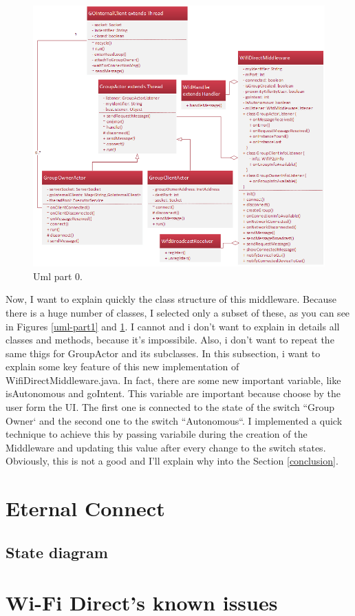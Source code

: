 \begin{figure}[thpb]
	\centering
	\includegraphics[scale=0.6]{./images/chap2/uml-parte2.png}
	\caption{Uml part 0.}
	\label{uml-part2}
\end{figure}	


Now, I want to explain quickly the class structure of this middleware. Because there is a huge number of classes, I selected only a subset of these, as you can see in Figures \ref{uml-part1} and \ref{uml-part2}.
I cannot and i don't want to explain in details all classes and methods, because it's impossibile. Also, i don't want to repeat the same thigs for GroupActor and its subclasses.
In this subsection, i want to explain some key feature of this new implementation of WifiDirectMiddleware.java.
In fact, there are some new important variable, like isAutonomous and goIntent. This variable are important because choose by the user form the UI. The first one is connected to the state of the switch ``Group Owner` and the second one to the switch ``Autonomous``. 
I implemented a quick technique to achieve this by passing variabile during the creation of the Middleware and updating this value after every change to the switch states. Obviously, this is not a good and I'll explain why into the Section \ref{conclusion}.


\section{Eternal Connect}


\subsection*{State diagram}


\section{Wi-Fi Direct's known issues}